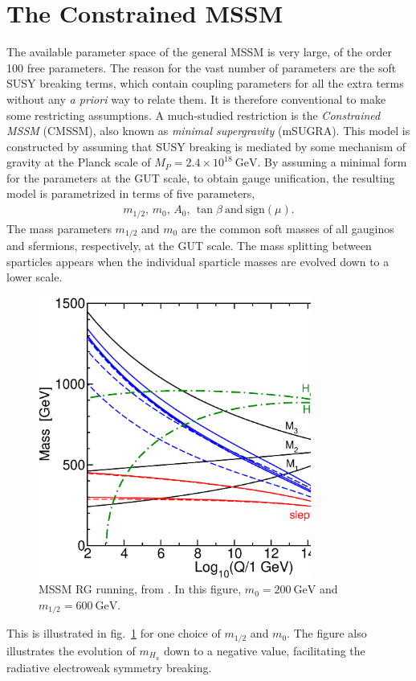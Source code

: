 \documentclass[twoside,english]{uiofysmaster}
\begin{document}
\section{The Constrained MSSM}
\label{sec:cmssm}
The available parameter space of the general MSSM is very large, of the order 100 free parameters. The reason for the vast number of parameters are the soft SUSY breaking terms, which contain coupling parameters for all the extra terms without any {\it a priori} way to relate them. It is therefore conventional to make some restricting assumptions. A much-studied restriction is the {\it Constrained MSSM} (CMSSM), also known as {\it minimal supergravity} (mSUGRA). This model is constructed by assuming that SUSY breaking is mediated by some mechanism of gravity at the Planck scale of $M_P = 2.4\times 10^{18} ~\mathrm{GeV}$. By assuming a minimal form for the parameters at the GUT scale, to obtain gauge unification, the resulting model is parametrized in terms of five parameters,
\begin{align}
	m_{1/2}, \, m_{0}, \, A_0, \, \tan\beta ~\mathrm{and} ~\mathrm{sign}(\mu).
\end{align}
The mass parameters $m_{1/2}$ and $m_0$ are the common soft masses of all gauginos and sfermions, respectively, at the GUT scale. The mass splitting between sparticles appears when the individual sparticle masses are evolved down to a lower scale.
\begin{figure}[hbt]
	\centering
	\includegraphics[width=0.8\textwidth]{figures/susyintro/MSSMrun.eps}
	\caption{MSSM RG running, from \cite{Martin:1997ns}. In this figure, $m_0 = 200 ~\mathrm{GeV}$ and $m_{1/2}= 600 ~\mathrm{GeV}$.}
	\label{fig:mssm_rgerun}
\end{figure}
This is illustrated in fig.\ \ref{fig:mssm_rgerun} for one choice of $m_{1/2}$ and $m_0$. The figure also illustrates the evolution of $m_{H_u}$ down to a negative value, facilitating the radiative electroweak symmetry breaking.
\end{document}
